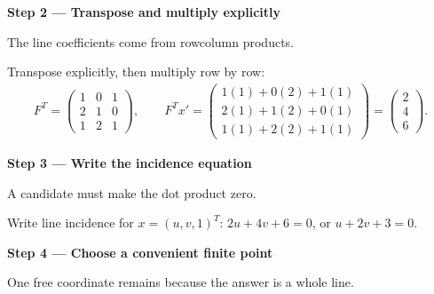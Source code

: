 \documentclass[letterpaper,11pt,english,openany,oneside]{jupyterBook}
\begin{document}
\par

\par\medskip{}
{\color{QuizStepRed}\bfseries Step 2 — Transpose and multiply explicitly}\par\smallskip

\sphinxAtStartPar
{} The line coefficients come from row\sphinxhyphen{}column products.

\sphinxAtStartPar
Transpose explicitly, then multiply row by row:
{\color{QuizMathBlue} \begin{equation*}
\begin{split}
F^T=\begin{pmatrix}1&0&1\\2&1&0\\1&2&1\end{pmatrix},\qquad
F^Tx'=\begin{pmatrix}1(1)+0(2)+1(1)\\2(1)+1(2)+0(1)\\1(1)+2(2)+1(1)\end{pmatrix}
=\begin{pmatrix}2\\4\\6\end{pmatrix}.
\end{split}
\end{equation*}}
\par

\par\medskip{}
{\color{QuizStepRed}\bfseries Step 3 — Write the incidence equation}\par\smallskip

\sphinxAtStartPar
{} A candidate must make the dot product zero.

\sphinxAtStartPar
Write line incidence for {\color{QuizMathBlue} \(x=(u,v,1)^T\)}: {\color{QuizMathBlue} \(2u+4v+6=0\)}, or {\color{QuizMathBlue} \(\boxed{u+2v+3=0}\)}.

\par

\par\medskip{}
{\color{QuizStepRed}\bfseries Step 4 — Choose a convenient finite point}\par\smallskip

\sphinxAtStartPar
{} One free coordinate remains because the answer is a whole line.
\end{document}
